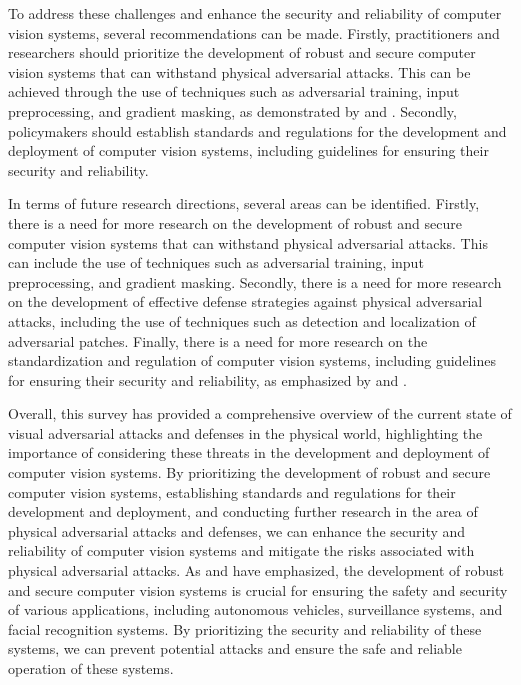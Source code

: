\documentclass[11pt]{article}
\begin{document}
To address these challenges and enhance the security and reliability of computer vision systems, several recommendations can be made. Firstly, practitioners and researchers should prioritize the development of robust and secure computer vision systems that can withstand physical adversarial attacks. This can be achieved through the use of techniques such as adversarial training, input preprocessing, and gradient masking, as demonstrated by \cite{ref39} and \cite{ref234}. Secondly, policymakers should establish standards and regulations for the development and deployment of computer vision systems, including guidelines for ensuring their security and reliability.

In terms of future research directions, several areas can be identified. Firstly, there is a need for more research on the development of robust and secure computer vision systems that can withstand physical adversarial attacks. This can include the use of techniques such as adversarial training, input preprocessing, and gradient masking. Secondly, there is a need for more research on the development of effective defense strategies against physical adversarial attacks, including the use of techniques such as detection and localization of adversarial patches. Finally, there is a need for more research on the standardization and regulation of computer vision systems, including guidelines for ensuring their security and reliability, as emphasized by \cite{ref67} and \cite{ref152}.

Overall, this survey has provided a comprehensive overview of the current state of visual adversarial attacks and defenses in the physical world, highlighting the importance of considering these threats in the development and deployment of computer vision systems. By prioritizing the development of robust and secure computer vision systems, establishing standards and regulations for their development and deployment, and conducting further research in the area of physical adversarial attacks and defenses, we can enhance the security and reliability of computer vision systems and mitigate the risks associated with physical adversarial attacks. As \cite{ref34} and \cite{ref235} have emphasized, the development of robust and secure computer vision systems is crucial for ensuring the safety and security of various applications, including autonomous vehicles, surveillance systems, and facial recognition systems. By prioritizing the security and reliability of these systems, we can prevent potential attacks and ensure the safe and reliable operation of these systems.
\end{document}
